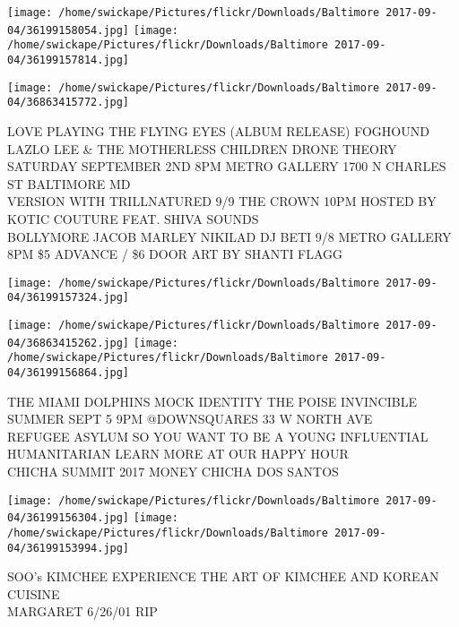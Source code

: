 \documentclass[10pt,letterpaper]{article}
\begin{document}
\texttt{[image: /home/swickape/Pictures/flickr/Downloads/Baltimore 2017-09-04/36199158054.jpg]}
\texttt{[image: /home/swickape/Pictures/flickr/Downloads/Baltimore 2017-09-04/36199157814.jpg]}

\texttt{[image: /home/swickape/Pictures/flickr/Downloads/Baltimore 2017-09-04/36863415772.jpg]}

LOVE PLAYING THE FLYING EYES (ALBUM RELEASE) FOGHOUND LAZLO LEE \& THE MOTHERLESS CHILDREN DRONE THEORY SATURDAY SEPTEMBER 2ND 8PM METRO GALLERY 1700 N CHARLES ST BALTIMORE MD\\
VERSION WITH TRILLNATURED 9/9 THE CROWN 10PM HOSTED BY KOTIC COUTURE FEAT. SHIVA SOUNDS\\
BOLLYMORE JACOB MARLEY NIKILAD DJ BETI 9/8 METRO GALLERY 8PM \$5 ADVANCE / \$6 DOOR ART BY SHANTI FLAGG
\pagebreak

\texttt{[image: /home/swickape/Pictures/flickr/Downloads/Baltimore 2017-09-04/36199157324.jpg]}

\vspace{0.25in}
\texttt{[image: /home/swickape/Pictures/flickr/Downloads/Baltimore 2017-09-04/36863415262.jpg]}
\texttt{[image: /home/swickape/Pictures/flickr/Downloads/Baltimore 2017-09-04/36199156864.jpg]}

THE MIAMI DOLPHINS MOCK IDENTITY THE POISE INVINCIBLE SUMMER SEPT 5 9PM @DOWNSQUARES 33 W NORTH AVE\\
REFUGEE ASYLUM SO YOU WANT TO BE A YOUNG INFLUENTIAL HUMANITARIAN LEARN MORE AT OUR HAPPY HOUR\\
CHICHA SUMMIT 2017 MONEY CHICHA DOS SANTOS
\pagebreak

\texttt{[image: /home/swickape/Pictures/flickr/Downloads/Baltimore 2017-09-04/36199156304.jpg]}
\texttt{[image: /home/swickape/Pictures/flickr/Downloads/Baltimore 2017-09-04/36199153994.jpg]}

SOO's KIMCHEE EXPERIENCE THE ART OF KIMCHEE AND KOREAN CUISINE\\
MARGARET 6/26/01 RIP
\pagebreak
\end{document}
